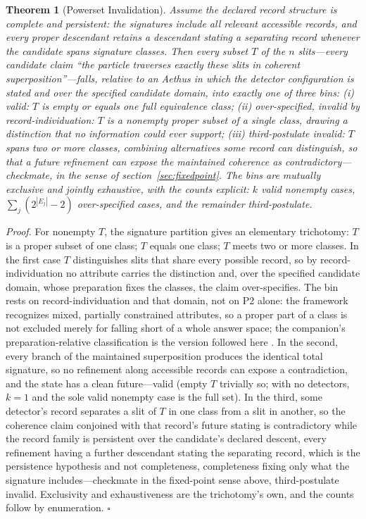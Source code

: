 \documentclass[11pt]{article}
\newtheorem{theorem}{Theorem}
\theoremstyle{definition}
\newcommand{\Aethus}{Aethus}
\begin{document}
\begin{theorem}[Powerset Invalidation]\label{thm:powerset-short} Assume the declared record structure is complete and persistent: the signatures include all relevant accessible records, and every proper descendant retains a descendant stating a separating record whenever the candidate spans signature classes. Then every subset $T$ of the $n$ slits---every candidate claim ``the particle traverses exactly these slits in coherent superposition''---falls, relative to an \Aethus{} in which the detector configuration is stated and over the specified candidate domain, into exactly one of three bins: (i) \emph{valid}: $T$ is empty or equals one full equivalence class; (ii) \emph{over-specified}, invalid by record-individuation: $T$ is a nonempty proper subset of a single class, drawing a distinction that no information could ever support; (iii) \emph{third-postulate invalid}: $T$ spans two or more classes, combining alternatives some record can distinguish, so that a future refinement can expose the maintained coherence as contradictory---checkmate, in the sense of section~\ref{sec:fixedpoint}. The bins are mutually exclusive and jointly exhaustive, with the counts explicit: $k$ valid nonempty cases, $\sum_j (2^{|E_j|} - 2)$ over-specified cases, and the remainder third-postulate.
\end{theorem}

\noindent\emph{Proof.} For nonempty $T$, the signature partition gives an elementary trichotomy: $T$ is a proper subset of one class; $T$ equals one class; $T$ meets two or more classes. In the first case $T$ distinguishes slits that share every possible record, so by record-individuation no attribute carries the distinction and, over the specified candidate domain, whose preparation fixes the classes, the claim over-specifies. The bin rests on record-individuation and that domain, not on P2 alone: the framework recognizes mixed, partially constrained attributes, so a proper part of a class is not excluded merely for falling short of a whole answer space; the companion's preparation-relative classification is the version followed here \cite{AethusQuant}. In the second, every branch of the maintained superposition produces the identical total signature, so no refinement along accessible records can expose a contradiction, and the state has a clean future---valid (empty $T$ trivially so; with no detectors, $k = 1$ and the sole valid nonempty case is the full set). In the third, some detector's record separates a slit of $T$ in one class from a slit in another, so the coherence claim conjoined with that record's future stating is contradictory while the record family is persistent over the candidate's declared descent, every refinement having a further descendant stating the separating record, which is the persistence hypothesis and not completeness, completeness fixing only what the signature includes---checkmate in the fixed-point sense above, third-postulate invalid. Exclusivity and exhaustiveness are the trichotomy's own, and the counts follow by enumeration. \hfill$\square$
\end{document}
